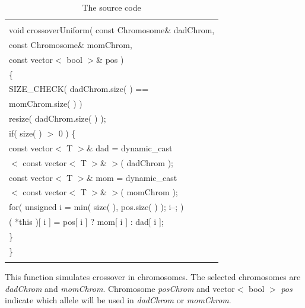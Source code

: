 \documentclass[twocolumn]{article}
\begin{document}
\begin{table}[h]
\begin{center}
\caption{The source code}
\label{SC6-2}
{\scriptsize
\begin{tabular}{|l|}\hline
\hspace*{7cm}\\
void crossoverUniform( const Chromosome\& dadChrom,\\
\hspace*{4mm} const Chromosome\& momChrom,\\
\hspace*{4mm} const vector$<$ bool $>$\& pos )\\
\{\\
\hspace*{4mm} SIZE\_CHECK( dadChrom.size( ) == \\
\hspace*{12mm} momChrom.size( ) )\\
\hspace*{4mm} resize( dadChrom.size( ) );\\
\hspace*{4mm} if( size( ) $>$ 0 ) \{\\
\hspace*{8mm} const vector$<$ T $>$\& dad = dynamic\_cast\\
\hspace*{12mm} $<$ const vector$<$ T $>$\& $>$( dadChrom );\\
\hspace*{8mm} const vector$<$ T $>$\& mom = dynamic\_cast\\
\hspace*{12mm} $<$ const vector$<$ T $>$\& $>$( momChrom );\\
\hspace*{8mm} for( unsigned i = min( size( ), pos.size( ) ); i--; )\\
\hspace*{12mm} ( *this )[ i ] = pos[ i ] ? mom[ i ] : dad[ i ];\\
\hspace*{4mm} \}\\
\}\\
\hspace*{7cm}\\\hline
\end{tabular}
}
\end{center}
\end{table}

\noindent
This function simulates crossover in chromosomes. The selected 
chromosomes are {\em dadChrom} and {\em momChrom}. Chromosome {\em
posChrom} and vector$<$ bool $>$ {\em pos} indicate which allele will be
used in {\em dadChrom} or {\em momChrom}.
\end{document}
